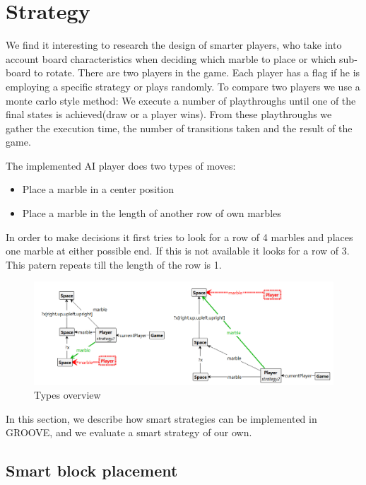 \section{Strategy}
\label{Strategy}
We find it interesting to research the design of smarter players, who take into account board characteristics when deciding which marble to place or which sub-board to rotate.
There are two players in the game. Each player has a flag if he is employing a specific strategy or plays randomly. 
To compare two players we use a monte carlo style method: We execute a number of playthroughs until one of the final states is achieved(draw or a player wins).
From these playthroughs we gather the execution time, the number of transitions taken and the result of the game.

\vspace{6pt}

The implemented AI player does two types of moves:
\begin{itemize}
\item Place a marble in a center position
\item Place a marble in the length of another row of own marbles
\end{itemize}

In order to make decisions it first tries to look for a row of 4 marbles and places one marble at either possible end. If this is not available it looks for a row of 3. This patern repeats till the length of the row is 1.

\begin{figure}[!h]
  \includegraphics[scale=0.5,clip]{Images/twocombined.png}
  \caption{Types overview}
  \label{fig:twocombined}
\end{figure}
In this section, we describe how smart strategies can be implemented in GROOVE, and we evaluate a smart strategy of our own.

\subsection{Smart block placement}

